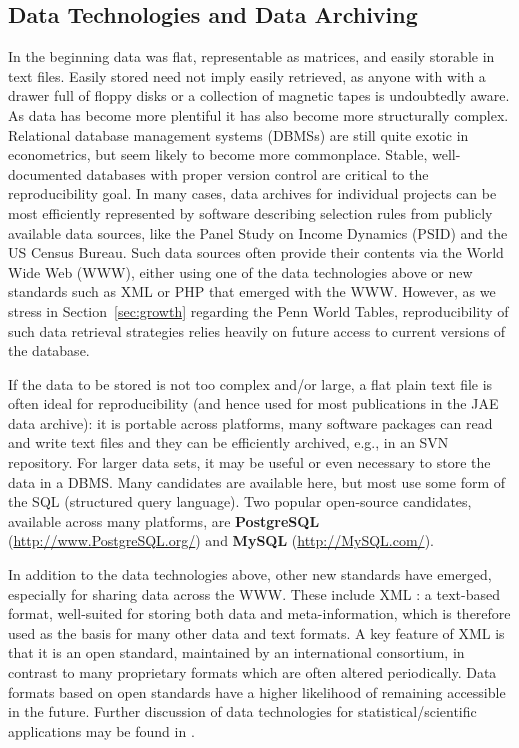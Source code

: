 \documentclass[10pt,a4paper,twoside]{article}
\let\pkg=\textbf
\let\proglang=\textsf
\begin{document}
\subsection{Data Technologies and Data Archiving} \label{sec:data}

In the beginning data was flat, representable as matrices, and easily storable in
text files.  Easily stored need not imply easily retrieved, as anyone with 
with a drawer full of floppy disks or a collection of magnetic tapes 
is undoubtedly aware. As data has become more plentiful it has also become
more structurally complex.
Relational database management systems (DBMSs) are still
quite exotic in econometrics, but seem likely to become more commonplace.
Stable, well-documented databases with proper version control are critical to
the reproducibility goal. 
In many cases, data archives for individual projects can be most efficiently
represented by software describing selection rules from publicly available
data sources, like the Panel Study on Income Dynamics (PSID) and the US
Census Bureau. Such data sources often provide their contents via the World
Wide Web (WWW), either using one of the data technologies above or new standards
such as \proglang{XML} or \proglang{PHP} 
that emerged with the WWW.
However, as we stress in Section~\ref{sec:growth} regarding the Penn World Tables,
reproducibility of such data retrieval strategies relies heavily on future access to
current versions of the database.

If the data to be stored is not too complex and/or large, a flat plain text file
is often ideal for reproducibility (and hence used for most publications in the
JAE data archive): it is portable across platforms, many software
packages can read and write text files and they can be efficiently archived, e.g.,
in an SVN repository.
For larger data sets, it may be useful or even necessary to store the data
in a DBMS. Many candidates are available here, but most use
some form of the \proglang{SQL} (structured query language).
Two popular open-source candidates, available across many platforms, are
\pkg{PostgreSQL} (\url{http://www.PostgreSQL.org/}) and \pkg{MySQL} (\url{http://MySQL.com/}).

In addition to the data technologies above, other new standards have emerged,
especially for sharing data across the WWW. These include 
\proglang{XML} \citep[extensible markup language,][]
{repro:Bray+Paoli+SperbergMcQueen:2008}: a text-based format,
well-suited for storing both data and meta-information, which is therefore used
as the basis for many other data and text formats. A key feature of \proglang{XML}
is that it is an open standard, maintained by an international consortium,
in contrast to many proprietary formats which are often altered periodically.
Data formats based on open standards have a higher likelihood of remaining accessible in the future. 
Further discussion of data technologies for statistical/scientific applications may
be found in \cite{repro:Murrell:2009}. 
\end{document}
